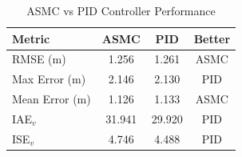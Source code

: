\begin{table}[h]
\centering
\caption{ASMC vs PID Controller Performance}
\label{tab:asmc_pid}
\begin{tabular}{lccc}
\toprule
\textbf{Metric} & \textbf{ASMC} & \textbf{PID} & \textbf{Better} \\
\midrule
RMSE (m) & 1.256 & 1.261 & ASMC \\
Max Error (m) & 2.146 & 2.130 & PID \\
Mean Error (m) & 1.126 & 1.133 & ASMC \\
IAE$_v$ & 31.941 & 29.920 & PID \\
ISE$_v$ & 4.746 & 4.488 & PID \\
\bottomrule
\end{tabular}
\end{table}
